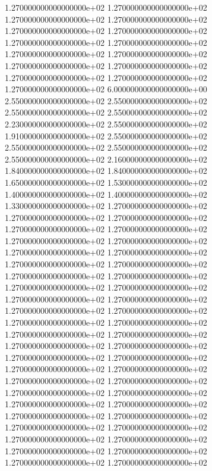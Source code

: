1.270000000000000000e+02 1.270000000000000000e+02 1.270000000000000000e+02 1.270000000000000000e+02 1.270000000000000000e+02 1.270000000000000000e+02 1.270000000000000000e+02 1.270000000000000000e+02 1.270000000000000000e+02 1.270000000000000000e+02 1.270000000000000000e+02 1.270000000000000000e+02 1.270000000000000000e+02 1.270000000000000000e+02 1.270000000000000000e+02 6.000000000000000000e+00 2.550000000000000000e+02 2.550000000000000000e+02 2.550000000000000000e+02 2.550000000000000000e+02 2.230000000000000000e+02 2.550000000000000000e+02 1.910000000000000000e+02 2.550000000000000000e+02 2.550000000000000000e+02 2.550000000000000000e+02 2.550000000000000000e+02 2.160000000000000000e+02 1.840000000000000000e+02 1.840000000000000000e+02 1.650000000000000000e+02 1.530000000000000000e+02 1.400000000000000000e+02 1.400000000000000000e+02 1.330000000000000000e+02 1.270000000000000000e+02 1.270000000000000000e+02 1.270000000000000000e+02 1.270000000000000000e+02 1.270000000000000000e+02 1.270000000000000000e+02 1.270000000000000000e+02 1.270000000000000000e+02 1.270000000000000000e+02 1.270000000000000000e+02 1.270000000000000000e+02 1.270000000000000000e+02 1.270000000000000000e+02 1.270000000000000000e+02 1.270000000000000000e+02 1.270000000000000000e+02 1.270000000000000000e+02 1.270000000000000000e+02 1.270000000000000000e+02 1.270000000000000000e+02 1.270000000000000000e+02 1.270000000000000000e+02 1.270000000000000000e+02 1.270000000000000000e+02 1.270000000000000000e+02 1.270000000000000000e+02 1.270000000000000000e+02 1.270000000000000000e+02 1.270000000000000000e+02 1.270000000000000000e+02 1.270000000000000000e+02 1.270000000000000000e+02 1.270000000000000000e+02 1.270000000000000000e+02 1.270000000000000000e+02 1.270000000000000000e+02 1.270000000000000000e+02 1.270000000000000000e+02 1.270000000000000000e+02 1.270000000000000000e+02 1.270000000000000000e+02 1.270000000000000000e+02 1.270000000000000000e+02 1.270000000000000000e+02 1.270000000000000000e+02
